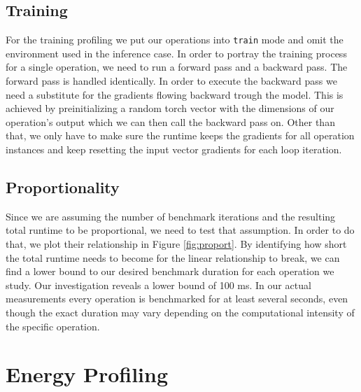 \subsection{Training}
For the training profiling we put our operations into \texttt{train} mode and omit the environment used in the inference case. In order to portray the training process for a single operation, we need to run a forward pass and a backward pass. The forward pass is handled identically. In order to execute the backward pass we need a substitute for the gradients flowing backward trough the model. This is achieved by preinitializing a random torch vector with the dimensions of our operation's output which we can then call the backward pass on. Other than that, we only have to make sure the runtime keeps the gradients for all operation instances and keep resetting the input vector gradients for each loop iteration.

\subsection{Proportionality}
Since we are assuming the number of benchmark iterations and the resulting total runtime to be proportional, we need to test that assumption. In order to do that, we plot their relationship in Figure \ref{fig:proport}. By identifying how short the total runtime needs to become for the linear relationship to break, we can find a lower bound to our desired benchmark duration for each operation we study. Our investigation reveals a lower bound of 100 ms. In our actual measurements every operation is benchmarked for at least several seconds, even though the exact duration may vary depending on the computational intensity of the specific operation.



\section{Energy Profiling}



